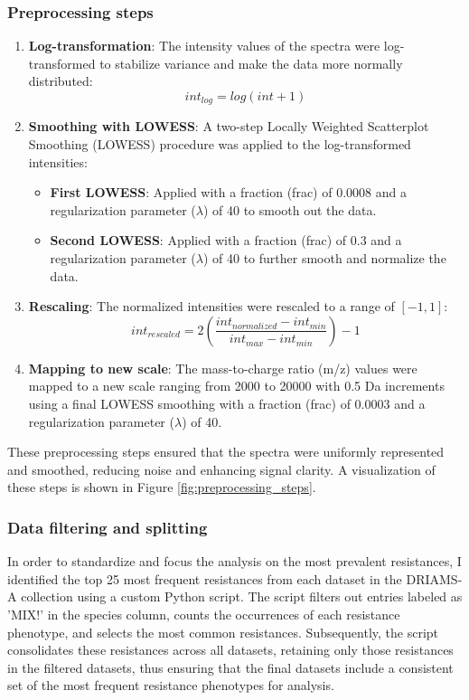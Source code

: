 \documentclass[english,11pt,a4paper,titlepage]{article}
\begin{document}
	\subsubsection*{Preprocessing steps}
	\begin{enumerate}
		\item \textbf{Log-transformation}: The intensity values of the spectra were log-transformed to stabilize variance and make the data more normally distributed:
		\begin{equation*}
			int_{log} = log(int + 1)
		\end{equation*}
		\item \textbf{Smoothing with LOWESS}: A two-step Locally Weighted Scatterplot Smoothing (LOWESS) procedure was applied to the log-transformed intensities:
		\begin{itemize}
			\item \textbf{First LOWESS}: Applied with a fraction (frac) of \( 0.0008 \) and a regularization parameter (\( \lambda \)) of 40 to smooth out the data.
			\item \textbf{Second LOWESS}: Applied with a fraction (frac) of \( 0.3 \) and a regularization parameter (\( \lambda \)) of 40 to further smooth and normalize the data.
		\end{itemize}
		\item \textbf{Rescaling}: The normalized intensities were rescaled to a range of \( [-1, 1] \):
		\begin{equation}
			int_{rescaled} = 2 \left( \frac{int_{normalized} - int_{min}}{int_{max} - int_{min}} \right) - 1
		\end{equation}
		\item \textbf{Mapping to new scale}: The mass-to-charge ratio (m/z) values were mapped to a new scale ranging from 2000 to 20000 with 0.5 Da increments using a final LOWESS smoothing with a fraction (frac) of \( 0.0003 \) and a regularization parameter (\( \lambda \)) of 40.
	\end{enumerate}
	These preprocessing steps ensured that the spectra were uniformly represented and smoothed, reducing noise and enhancing signal clarity. A visualization of these steps is shown in Figure \ref{fig:preprocessing_steps}.
	
	\subsubsection*{Data filtering and splitting}
	In order to standardize and focus the analysis on the most prevalent resistances, I identified the top 25 most frequent resistances from each dataset in the DRIAMS-A collection using a custom Python script. The script filters out entries labeled as 'MIX!' in the species column, counts the occurrences of each resistance phenotype, and selects the most common resistances. Subsequently, the script consolidates these resistances across all datasets, retaining only those resistances in the filtered datasets, thus ensuring that the final datasets include a consistent set of the most frequent resistance phenotypes for analysis.
	
\end{document}
